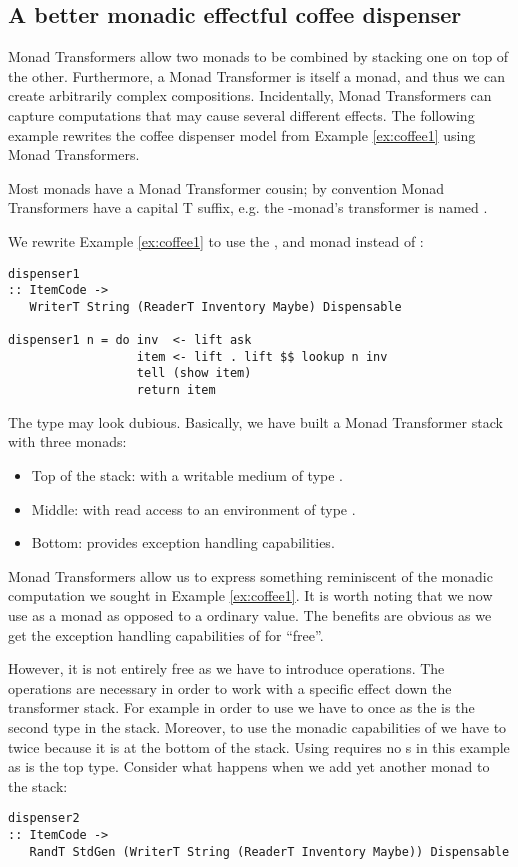 \subsection{A better monadic effectful coffee dispenser}\label{sec:mt}
Monad Transformers allow two monads to be combined by stacking one on top of the other. 
Furthermore, a Monad Transformer is itself a monad, and thus we can create arbitrarily complex compositions.
Incidentally, Monad Transformers can capture computations that may cause several different effects.
The following example rewrites the coffee dispenser model from Example \ref{ex:coffee1} using Monad Transformers.
\begin{example}\label{ex:coffee2}
Most monads have a Monad Transformer cousin; by convention Monad Transformers have a capital T suffix, e.g. the -monad's transformer is named .

We rewrite Example \ref{ex:coffee1} to use the , and  monad instead of :
\begin{lstlisting}[style={haskell}]
dispenser1 
:: ItemCode -> 
   WriterT String (ReaderT Inventory Maybe) Dispensable

dispenser1 n = do inv  <- lift ask
                  item <- lift . lift $$ lookup n inv
                  tell (show item)
                  return item
\end{lstlisting}
The type may look dubious. Basically, we have built a Monad Transformer stack with three monads:
\begin{itemize}
  \item Top of the stack:  with a writable medium of type .
  \item Middle:  with read access to an environment of type .
  \item Bottom:  provides exception handling capabilities.
\end{itemize}
Monad Transformers allow us to express something reminiscent of the monadic computation we sought in Example \ref{ex:coffee1}. It is worth noting that we now use  as a monad as opposed to a ordinary value. The benefits are obvious as we get the exception handling capabilities of  for ``free''.

However, it is not entirely free as we have to introduce  operations. The  operations are necessary in order to work with a specific effect down the transformer stack. For example in order to use  we have to  once as the  is the second type in the stack. Moreover, to use the monadic capabilities of  we have to  twice because it is at the bottom of the stack. Using  requires no s in this example as  is the top type. 
Consider what happens when we add yet another monad to the stack:
\begin{lstlisting}[style={haskell}]
dispenser2 
:: ItemCode -> 
   RandT StdGen (WriterT String (ReaderT Inventory Maybe)) Dispensable


\end{lstlisting}
\end{example}
